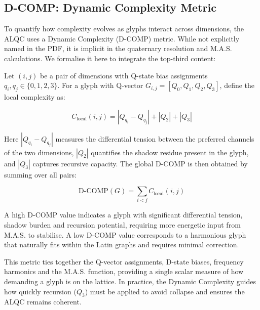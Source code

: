 \documentclass[11pt, letterpaper]{article}
\begin{document}
\subsection{D-COMP: Dynamic Complexity Metric}\label{sec:8.10}

To quantify how complexity evolves as glyphs interact across dimensions, the ALQC uses a Dynamic Complexity (D-COMP) metric. While not explicitly named in the PDF, it is implicit in the quaternary resolution and M.A.S. calculations. We formalise it here to integrate the top-third content:

Let $(i,j)$ be a pair of dimensions with Q-state bias assignments $q_i, q_j \in \{0,1,2,3\}$. For a glyph with Q-vector $G_{i,j}=[Q_0,Q_1,Q_2,Q_3]$, define the local complexity as:

\[
C_{\mathrm{local}}(i, j) = |Q_{q_i} - Q_{q_j}| + |Q_2| + |Q_3|
\]

Here $|Q_{q_i} - Q_{q_j}|$ measures the differential tension between the preferred channels of the two dimensions, $|Q_2|$ quantifies the shadow residue present in the glyph, and $|Q_3|$ captures recursive capacity. The global D-COMP is then obtained by summing over all pairs:

\[
\mathrm{D\text{-}COMP}(G) = \sum_{i<j} C_{\mathrm{local}}(i, j)
\]

A high D-COMP value indicates a glyph with significant differential tension, shadow burden and recursion potential, requiring more energetic input from M.A.S. to stabilise. A low D-COMP value corresponds to a harmonious glyph that naturally fits within the Latin graphs and requires minimal correction.

This metric ties together the Q-vector assignments, D-state biases, frequency harmonics and the M.A.S. function, providing a single scalar measure of how demanding a glyph is on the lattice. In practice, the Dynamic Complexity guides how quickly recursion ($Q_3$) must be applied to avoid collapse and ensures the ALQC remains coherent.
\end{document}
